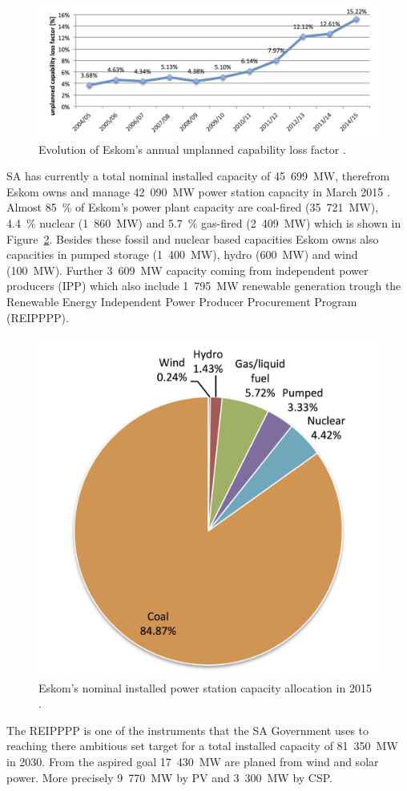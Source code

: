 \begin{figure}[htbp]  
\centering
\includegraphics[width=1\linewidth]{FIG/UCLF}
\caption[Evolution of Eskom's annual unplanned capability loss factor.]{Evolution of Eskom's annual unplanned capability loss factor \cite{Eskom2015b,Eskom2015d}.}\label{UCLF}
\end{figure}
SA has currently a total nominal installed capacity of 45~699~MW, therefrom Eskom owns and manage 42~090~MW power station capacity in March 2015 \cite{Eskom2015b}. Almost 85~\% of Eskom's power plant capacity are coal-fired (35~721~MW), 4.4~\% nuclear (1~860~MW) and 5.7~\% gas-fired (2~409~MW) which is shown in Figure~\ref{PgenerationEskom}. Besides these fossil and nuclear based capacities Eskom owns also capacities in pumped storage (1~400~MW), hydro (600~MW) and wind (100~MW). Further 3~609~MW capacity coming from independent power producers (IPP) which also include 1~795~MW renewable generation trough the Renewable Energy Independent Power Producer Procurement Program (REIPPPP). \cite{Eskom2015a}

\begin{figure}[htbp]  
\centering
\includegraphics[width=0.45\linewidth]{FIG/PgenerationEskom}
\caption[Eskom's nominal installed power station capacity allocation in 2015.]{Eskom's nominal installed power station capacity allocation in 2015 \cite{Eskom2015a}.}\label{PgenerationEskom}
\end{figure}
The REIPPPP is one of the instruments that the SA Government uses to reaching there ambitious set target for a total installed capacity of 81~350~MW in 2030. From the aspired goal 17~430~MW are planed from wind and solar power. More precisely 9~770~MW by PV and 3~300~MW by CSP. \cite{DoE2013}

